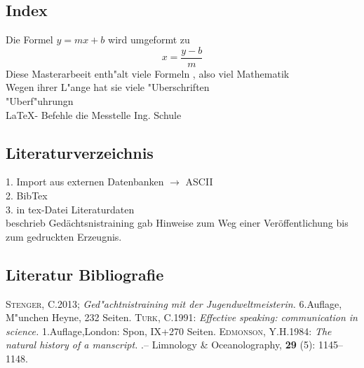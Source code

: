 \documentclass[a4paper,12pt,titlepage]{article} %
\begin{document}
\subsection{Index}
Die Formel  $y=mx + b$ wird umgeformt zu
\begin{displaymath}
 x = \frac{y - b}{m}
\end{displaymath}
Diese Masterarbeeit enth"alt viele Formeln 
, also viel Mathematik \\
Wegen ihrer L"ange hat sie viele "Uberschriften \\
"Uberf"uhrungn \\
\LaTeX - Befehle 
die Messtelle \glqq Ing. Schule\grqq \\


\subsection{Literaturverzeichnis}

1. Import aus externen Datenbanken $\rightarrow$ ASCII \\
2. BibTex \\
3. in tex-Datei Literaturdaten \\

\cite{Stenger} beschrieb Gedächtsnistraining
\cite[Seite 53]{edmonson 1984} gab Hinweise zum Weg einer Veröffentlichung bis zum gedruckten Erzeugnis.

\subsection{Literatur Bibliografie}
\begin{thebibliography}{99}
 \textsc{Stenger}, C.2013;
 \emph{Ged"achtnistraining mit der Jugendweltmeisterin.} 6.Auflage, M"unchen Heyne, 232 Seiten.
 \textsc{Turk}, C.1991:
 \emph{Effective speaking: communication in science.} 1.Auflage,London: Spon, IX+270 Seiten.
 \textsc{Edmonson}, Y.H.1984:
 \emph{The natural history of a manscript.} .-- Limnology \& Oceanolography, \textbf{29} (5): 1145--1148.
\end{thebibliography}










\printindex
\end{document}
